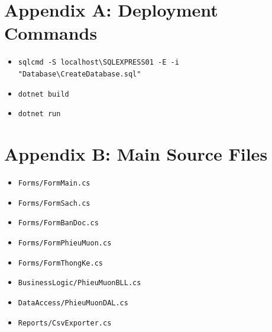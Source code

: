 \documentclass[12pt,a4paper]{article}
\begin{document}
\appendix
\section{Appendix A: Deployment Commands}
\begin{itemize}[leftmargin=1.5cm]
    \item \texttt{sqlcmd -S localhost\textbackslash SQLEXPRESS01 -E -i "Database\textbackslash CreateDatabase.sql"}
    \item \texttt{dotnet build}
    \item \texttt{dotnet run}
\end{itemize}

\section{Appendix B: Main Source Files}
\begin{itemize}[leftmargin=1.5cm]
    \item \texttt{Forms/FormMain.cs}
    \item \texttt{Forms/FormSach.cs}
    \item \texttt{Forms/FormBanDoc.cs}
    \item \texttt{Forms/FormPhieuMuon.cs}
    \item \texttt{Forms/FormThongKe.cs}
    \item \texttt{BusinessLogic/PhieuMuonBLL.cs}
    \item \texttt{DataAccess/PhieuMuonDAL.cs}
    \item \texttt{Reports/CsvExporter.cs}
\end{itemize}
\end{document}
